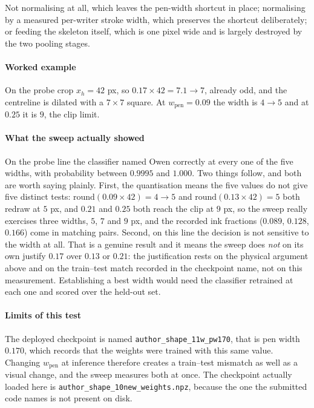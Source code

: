 Not normalising at all, which leaves the pen-width shortcut in place; normalising by a measured per-writer stroke width, which preserves the shortcut deliberately; or feeding the skeleton itself, which is one pixel wide and is largely destroyed by the two pooling stages.

\paragraph{Worked example}

On the probe crop $x_h = 42$ px, so $0.17 \times 42 = 7.1 \to 7$, already odd, and the centreline is dilated with a $7\times7$ square. At $w_{\text{pen}} = 0.09$ the width is $4 \to 5$ and at $0.25$ it is $9$, the clip limit.

\paragraph{What the sweep actually showed}

On the probe line the classifier named Owen correctly at every one of the five widths, with probability between $0.9995$ and $1.000$. Two things follow, and both are worth saying plainly. First, the quantisation means the five values do not give five distinct tests: $\mathrm{round}(0.09 \times 42) = 4 \to 5$ and $\mathrm{round}(0.13 \times 42) = 5$ both redraw at $5$ px, and $0.21$ and $0.25$ both reach the clip at $9$ px, so the sweep really exercises three widths, $5$, $7$ and $9$ px, and the recorded ink fractions ($0.089$, $0.128$, $0.166$) come in matching pairs. Second, on this line the decision is not sensitive to the width at all. That is a genuine result and it means the sweep does \emph{not} on its own justify $0.17$ over $0.13$ or $0.21$: the justification rests on the physical argument above and on the train--test match recorded in the checkpoint name, not on this measurement. Establishing a best width would need the classifier retrained at each one and scored over the held-out set.

\paragraph{Limits of this test}

The deployed checkpoint is named \texttt{author\_shape\_11w\_pw170}, that is pen width $0.170$, which records that the weights were trained with this same value. Changing $w_{\text{pen}}$ at inference therefore creates a train--test mismatch as well as a visual change, and the sweep measures both at once. The checkpoint actually loaded here is \texttt{author\_shape\_10new\_weights.npz}, because the one the submitted code names is not present on disk.

